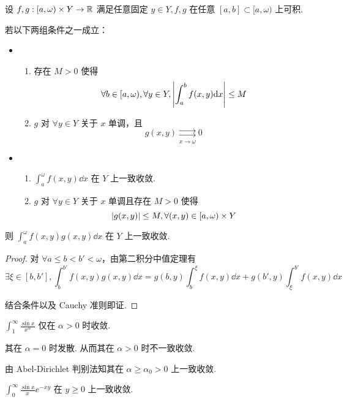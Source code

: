 \begin{property}
    设 $f,g:[a,\omega)\times Y\to\mathbb{R}$ 满足任意固定 $y\in Y,f,g$ 在任意 $[a,b]\subset[a,\omega)$ 上可积.

    若以下两组条件之一成立：

    \begin{itemize}
        \item \begin{enumerate}
            \item 存在 $M>0$ 使得
$$
\forall b\in[a,\omega),\forall y\in Y,\left\lvert{\int_a^bf(x,y)\mathrm{d}x}\right\rvert\le M
$$

            \item $g$ 对 $\forall y\in Y$ 关于 $x$ 单调，且
$$
g(x,y)\underset{x\to\omega}{\rightrightarrows}0
$$
        \end{enumerate}

        \item \begin{enumerate}
            \item $\displaystyle\int_a^\omega f(x,y)\dd x$ 在 $Y$ 上一致收敛.
            
            \item $g$ 对 $\forall y\in Y$ 关于 $x$ 单调且存在 $M>0$ 使得
$$
\left\lvert{g(x,y)}\right\rvert\le M,\forall(x,y)\in[a,\omega)\times Y
$$
        \end{enumerate}
    \end{itemize}

    则 $\displaystyle\int_a^\omega f(x,y)g(x,y)\dd x$ 在 $Y$ 上一致收敛.
\end{property}
\begin{proof}
    对 $\forall a\le b<b'<\omega$，由第二积分中值定理有
$$
\exists\xi\in[b,b'],\int_b^{b'}f(x,y)g(x,y)\dd x=g(b,y)\int_b^\xi f(x,y)\dd x+g(b',y)\int_\xi^{b'}f(x,y)\dd x
$$

    结合条件以及 Cauchy 准则即证.
\end{proof}

\begin{example}
    $\displaystyle\int_1^\infty\frac{\sin x}{x^\alpha}$ 仅在 $\alpha>0$ 时收敛.

    其在 $\alpha=0$ 时发散. 从而其在 $\alpha>0$ 时不一致收敛.

    由 Abel-Dirichlet 判别法知其在 $\alpha\ge\alpha_0>0$ 上一致收敛.
\end{example}

\begin{example}
    $\displaystyle\int_0^\infty\frac{\sin x}{x}e^{-xy}$ 在 $y\ge 0$ 上一致收敛.
\end{example}

